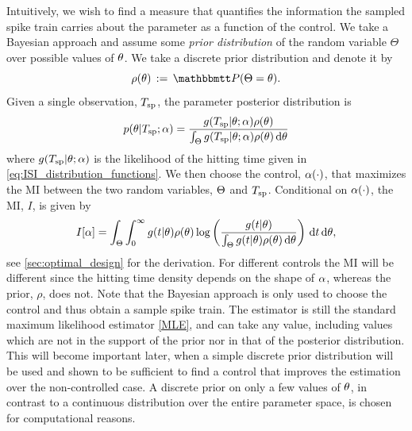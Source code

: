
Intuitively, we wish to find a measure that quantifies the information
the sampled spike train carries about the parameter as a function of
the control. We take a Bayesian approach and assume some {\sl  prior
  distribution} of the random variable $\Theta$ over
possible values of ${ \theta}$. We take a discrete prior distribution
and denote it by
$$
\rho(\th) \, := \,  \Prob(\Theta = \th)  . 
$$
Given a single observation, ${ T_{\textrm{sp} } }$, the parameter posterior 
distribution is 
\begin{equation}
p({ \theta}| { T_{\textrm{sp} } }; \alpha) =
\frac{g({ T_{\textrm{sp} } } |{ \theta}; \alpha) \rho({ \theta})}{\int_\Theta g({ T_{\textrm{sp} } }|{ \theta}; \alpha) \rho({ \theta})
\, \mathrm{d} { \theta}}
\label{eq:parameter_posterior_defn}
\end{equation} 
where $ g( { T_{\textrm{sp} } } |{ \theta}; \alpha)$ is the likelihood of the hitting time given in
\cref{eq:ISI_distribution_functions}. We then choose the control,
$\alpha(\cdot)$, that maximizes the MI  between the two random variables, ${\Theta}$ and ${ T_{\textrm{sp} } }$. Conditional on
$\alpha(\cdot)$, the MI, $I$, is given by
\begin{equation}
I[\alpha]= 
\int_\Theta \int_0^\infty g(t|{ \theta})\rho({ \theta})  
\log \left( \frac{g(t|{ \theta})}
{\int_\Theta g(t|{ \theta})\rho({ \theta}) \, \mathrm{d} { \theta}   } \right)
\, \mathrm{d} t\, \mathrm{d} { \theta},
\label{eq:J_mutual_info_objective}
\end{equation} 
see \cref{sec:optimal_design} for the derivation. For different controls
the MI will be different since the hitting time
density depends on the shape of $\alpha$, whereas the prior, $\rho$, does
not. Note that the Bayesian approach is only used to choose the
control and thus obtain a sample spike train. The estimator is still the
standard maximum likelihood estimator \cref{MLE}, and can take any
value, including values which are not in the support of the prior nor in that of the
posterior distribution. This will become 
important later, when a simple discrete prior distribution will be
used and shown to be sufficient to find a control that improves
the estimation over the non-controlled case. A discrete prior on
only a few values of ${ \theta}$, in contrast to a continuous distribution
over the entire parameter space, is chosen for computational reasons. 
  
